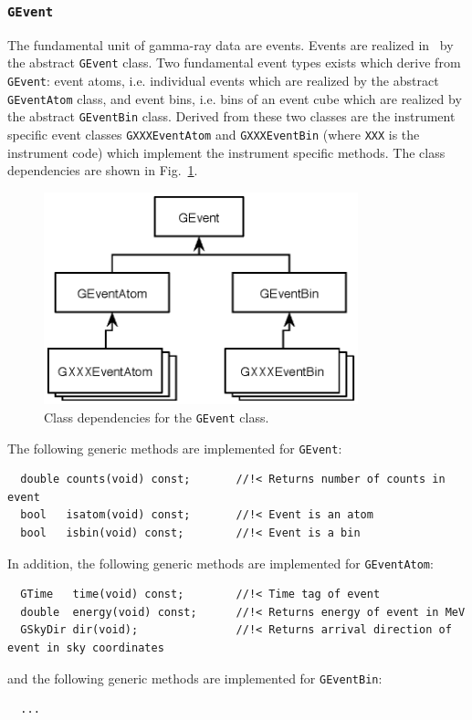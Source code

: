 \documentclass{article}[12pt,a4]
\begin{document}
\subsubsection{{\tt GEvent}}

The fundamental unit of gamma-ray data are events.
Events are realized in \this\ by the abstract {\tt GEvent} class.
Two fundamental event types exists which derive from {\tt GEvent}:
event atoms, i.e. individual events which are realized by the abstract {\tt GEventAtom} class, and
event bins, i.e. bins of an event cube which are realized by the abstract {\tt GEventBin} class.
Derived from these two classes are the instrument specific event classes
{\tt GXXXEventAtom} and {\tt GXXXEventBin} (where {\tt XXX} is the instrument code)
which implement the instrument specific methods.
The class dependencies are shown in Fig.~\ref{fig:GEvent}.
%
%
\begin{figure}[!h]
\centering
\includegraphics[width=9.1cm]{GEvent.eps}
\caption{Class dependencies for the {\tt GEvent} class.}
\label{fig:GEvent}
\end{figure}
%

The following generic methods are implemented for {\tt GEvent}:
\begin{verbatim}
  double counts(void) const;       //!< Returns number of counts in event
  bool   isatom(void) const;       //!< Event is an atom
  bool   isbin(void) const;        //!< Event is a bin
\end{verbatim}

In addition, the following generic methods are implemented for {\tt GEventAtom}:
\begin{verbatim}
  GTime   time(void) const;        //!< Time tag of event
  double  energy(void) const;      //!< Returns energy of event in MeV
  GSkyDir dir(void);               //!< Returns arrival direction of event in sky coordinates
\end{verbatim}
and the following generic methods are implemented for {\tt GEventBin}:
\begin{verbatim}
  ...
\end{verbatim}
\end{document}
